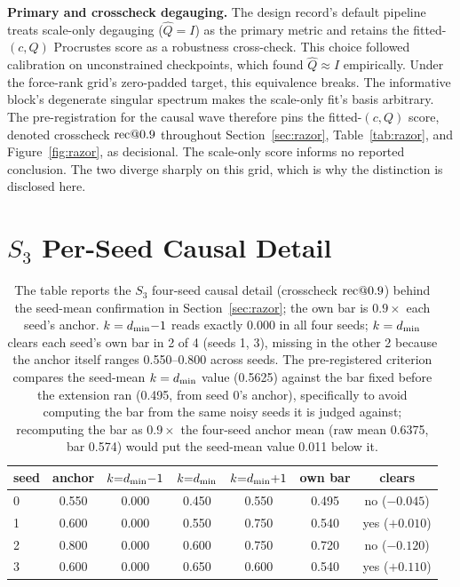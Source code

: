 \textbf{Primary and crosscheck degauging.} The design record's default
pipeline treats scale-only degauging ($\hat{Q} = I$) as the primary
metric and retains the fitted-$(c, Q)$ Procrustes score as a robustness
cross-check. This choice followed calibration on unconstrained
checkpoints, which found $\hat{Q} \approx I$ empirically. Under the
force-rank grid's zero-padded target, this equivalence breaks. The
informative block's degenerate singular spectrum makes the scale-only
fit's basis arbitrary. The pre-registration for the causal wave therefore
pins the fitted-$(c, Q)$ score, denoted crosscheck $\mathrm{rec}@0.9$ throughout
Section~\ref{sec:razor}, Table~\ref{tab:razor}, and
Figure~\ref{fig:razor}, as decisional. The scale-only score informs no
reported conclusion. The two diverge sharply on this grid, which is why the
distinction is disclosed here.

\section{$S_3$ Per-Seed Causal Detail}
\label{app:s3causal}

\begin{table}[H]
\centering
\small
\begin{tabular}{lcccccc}
\toprule
seed & anchor & $k{=}d_{\min}{-}1$ & $k{=}d_{\min}$ & $k{=}d_{\min}{+}1$ & own bar & clears \\
\midrule
0 & 0.550 & 0.000 & 0.450 & 0.550 & 0.495 & no ($-0.045$) \\
1 & 0.600 & 0.000 & 0.550 & 0.750 & 0.540 & yes ($+0.010$) \\
2 & 0.800 & 0.000 & 0.600 & 0.750 & 0.720 & no ($-0.120$) \\
3 & 0.600 & 0.000 & 0.650 & 0.600 & 0.540 & yes ($+0.110$) \\
\bottomrule
\end{tabular}
\caption{The table reports the $S_3$ four-seed causal detail (crosscheck
$\mathrm{rec}@0.9$) behind the seed-mean confirmation in
Section~\ref{sec:razor}; the own bar is
$0.9 \times$ each seed's anchor. $k = d_{\min}{-}1$ reads exactly 0.000 in
all four seeds; $k = d_{\min}$ clears each seed's own bar in 2 of 4 (seeds
1, 3), missing in the other 2 because the anchor itself ranges
0.550--0.800 across seeds. The pre-registered criterion compares the
seed-mean $k = d_{\min}$ value (0.5625) against the bar fixed before the
extension ran (0.495, from seed 0's anchor), specifically to avoid
computing the bar from the same noisy seeds it is judged against;
recomputing the bar as $0.9\times$ the four-seed anchor mean (raw mean
0.6375, bar 0.574) would put the seed-mean value 0.011 below it.}
\label{tab:s3seeds}
\end{table}

